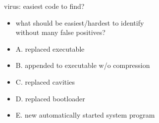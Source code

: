 \begin{frame}{virus: easiest code to find?}
    \begin{itemize}
    \item what should be easiest/hardest to identify \\
        without many false positives?
    \vspace{.5cm}
        \item A. replaced executable
        \item B. appended to executable w/o compression
        \item C. replaced cavities
        \item D. replaced bootloader
        \item E. new automatically started system program
    \end{itemize}
\end{frame}

